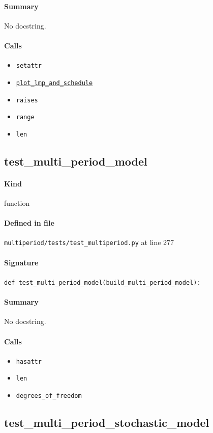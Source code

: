 \documentclass[11pt]{report}
\begin{document}
\paragraph{Summary} No docstring.
\paragraph{Calls}
\begin{itemize}[leftmargin=*]
  \item \texttt{setattr}
  \item \hyperref[def:multiperiod-multiperiod.py:MultiPeriodModel.plot_lmp_and_schedule:L597]{\texttt{plot\_lmp\_and\_schedule}}
  \item \texttt{raises}
  \item \texttt{range}
  \item \texttt{len}
\end{itemize}
\subsection{test\_multi\_period\_model}
\label{def:multiperiod-tests-test_multiperiod.py:test_multi_period_model:L277}
\paragraph{Kind} function
\paragraph{Defined in file} \texttt{multiperiod/tests/test\_multiperiod.py} at line 277
\paragraph{Signature} \texttt{def test\_multi\_period\_model(build\_multi\_period\_model):}
\paragraph{Summary} No docstring.
\paragraph{Calls}
\begin{itemize}[leftmargin=*]
  \item \texttt{hasattr}
  \item \texttt{len}
  \item \texttt{degrees\_of\_freedom}
\end{itemize}
\subsection{test\_multi\_period\_stochastic\_model}
\label{def:multiperiod-tests-test_multiperiod.py:test_multi_period_stochastic_model:L290}
\end{document}
